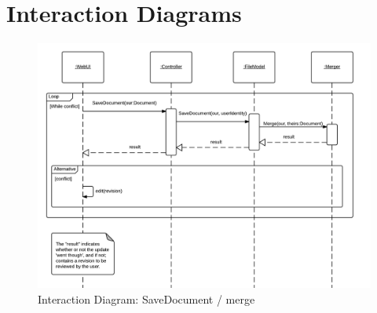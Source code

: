 \section{Interaction Diagrams}
\label{sec:interactiondiagrams}

\begin{figure}[htb]
	\centering
	\includegraphics[width=1\textwidth]{Appendices/graphics/Interaction-merge.png}
	\caption{Interaction Diagram: SaveDocument / merge}
	\label{fig:interaction-merge-diagram}
\end{figure}

